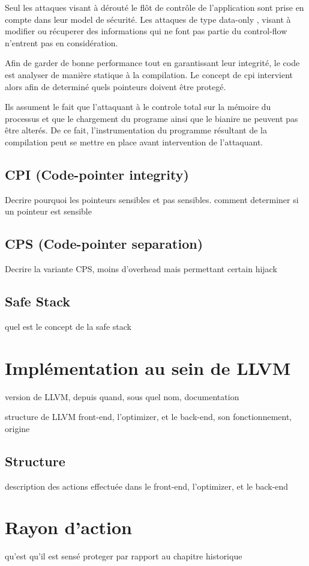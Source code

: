 Seul les attaques visant à dérouté le flôt de contrôle de l'application sont prise en compte dans leur model de sécurité. Les attaques de type \og data-only \fg, visant à modifier ou récuperer des informations qui ne font pas partie du control-flow n'entrent pas en considération.

Afin de garder de bonne performance tout en garantissant leur integrité, le code est analyser de manière statique à la compilation. Le concept de \gls{cpi} \cite{CPIPaper} intervient alors afin de determiné quels pointeurs doivent être protegé.

Ils assument le fait que l'attaquant à le controle total sur la mémoire du processus et que le chargement du programe ainsi que le bianire ne peuvent pas être alterés. De ce fait, l'instrumentation du programme résultant de la compilation peut se mettre en place avant intervention de l'attaquant.

\subsection{CPI (Code-pointer integrity)}

Decrire pourquoi les pointeurs sensibles et pas sensibles. comment determiner si un pointeur est sensible

\subsection{CPS (Code-pointer separation)}

Decrire la variante CPS, moins d'overhead mais permettant certain hijack

\subsection{Safe Stack}

quel est le concept de la safe stack

\section{Implémentation au sein de LLVM}

version de LLVM, depuis quand, sous quel nom, documentation

structure de LLVM front-end, l'optimizer, et le back-end, son fonctionnement, origine

\subsection{Structure}

description des actions effectuée dans le front-end, l'optimizer, et le back-end

\section{Rayon d'action}

qu'est qu'il est sensé proteger par rapport au chapitre historique
